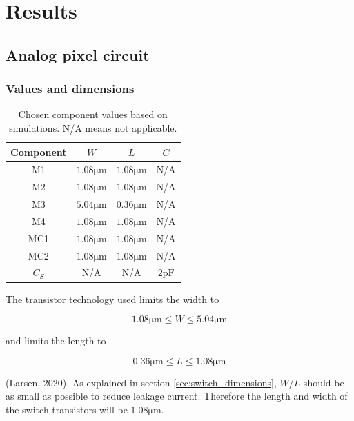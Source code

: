 \section{Results}
\subsection{Analog pixel circuit}
\subsubsection{Values and dimensions}

\begin{table}[H]
    \centering
    \caption{Chosen component values based on simulations. N/A means not applicable.}
    \begin{tabular}{|c|c|c|c|}
        \hline
        Component & $W$ & $L$ & $C$ \\
        \hline
        M1 & $1.08 \mathrm{\mu m}$ & $1.08 \mathrm{\mu m}$ & N/A \\
        \hline
        M2 & $1.08 \mathrm{\mu m}$ & $1.08 \mathrm{\mu m}$ & N/A \\
        \hline
        M3 & $5.04 \mathrm{\mu m}$ & $0.36 \mathrm{\mu m}$ & N/A \\
        \hline
        M4 & $1.08 \mathrm{\mu m}$ & $1.08 \mathrm{\mu m}$ & N/A \\
        \hline
        MC1 & $1.08 \mathrm{\mu m}$ & $1.08 \mathrm{\mu m}$ & N/A \\
        \hline
        MC2 & $1.08 \mathrm{\mu m}$ & $1.08 \mathrm{\mu m}$ & N/A \\
        \hline
        $C_S$ & N/A & N/A & $2 \mathrm{pF}$ \\
        \hline
    \end{tabular}
\end{table}

The transistor technology used limits the width to 

\begin{equation}
    \label{eq:limitsW}
    1.08 \mathrm{\mu m} \leq W \leq 5.04 \mathrm{\mu m}
\end{equation}

and limits the length to

\begin{equation}
    \label{eq:limitsL}
    0.36 \mathrm{\mu m} \leq L \leq 1.08 \mathrm{\mu m}
\end{equation}

(Larsen, 2020). As explained in section \ref{sec:switch_dimensions}, $W/L$ should be as small as possible to reduce leakage current. Therefore the length and width of the switch transistors will be $1.08\mathrm{\mu m}$.

